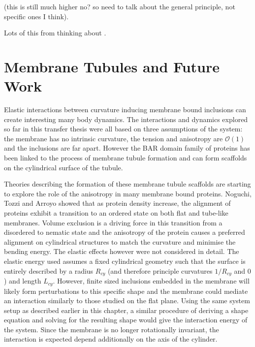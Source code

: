 {(this is still much higher no? so need to talk about the general principle, not specific ones I think).

Lots of this from thinking about \cite{simunovic_when_2015}.

\section{Membrane Tubules and Future Work}

Elastic interactions between curvature inducing membrane bound inclusions can create interesting many body dynamics. The interactions and dynamics explored so far in this transfer thesis were all based on three assumptions of the system: the membrane has no intrinsic curvature, the tension and anisotropy are $\mathcal{O}(1)$ and the inclusions are far apart. However the BAR domain family of proteins has been linked to the process of membrane tubule formation and can form scaffolds on the cylindrical surface of the tubule.\cite{le_roux_dynamic_2021}

Theories describing the formation of these membrane tubule scaffolds are starting to explore the role of the anisotropy in many membrane bound proteins.\cite{noguchi_binding_2022} Noguchi, Tozzi and Arroyo showed that as protein density increase, the alignment of proteins exhibit a transition to an ordered state on both flat and tube-like membranes.\cite{noguchi_binding_2022} Volume exclusion is a driving force in this transition from a disordered to nematic state and the anisotropy of the protein causes a preferred alignment on cylindrical structures to match the curvature and minimise the bending energy. The elastic effects however were not considered in detail. The elastic energy used assumes a fixed cylindrical geometry such that the surface is entirely described by a radius $R_{cy}$ (and therefore principle curvatures $1/R_{cy}$ and $0$) and length $L_{cy}$. However, finite sized inclusions embedded in the membrane will likely form perturbations to this specific shape and the membrane could mediate an interaction similarly to those studied on the flat plane. Using the same system setup as described earlier in this chapter, a similar procedure of deriving a shape equation and solving for the resulting shape would give the interaction energy of the system. Since the membrane is no longer rotationally invariant, the interaction is expected depend additionally on the axis of the cylinder.

}
